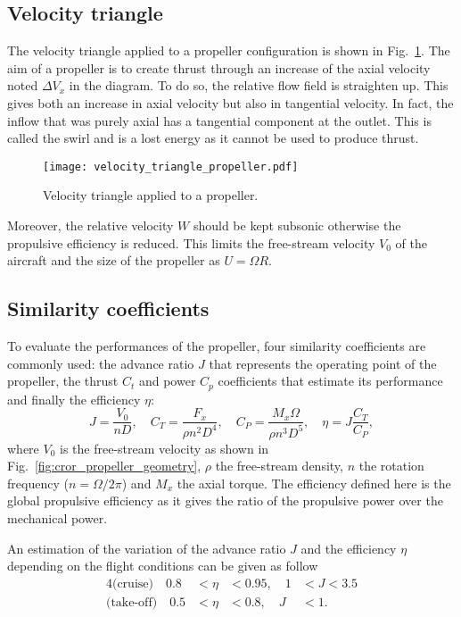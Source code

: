 \subsection{Velocity triangle}
\label{sub:cror_propeller_velocity_triangle}
The velocity triangle applied to a propeller configuration
is shown in Fig.~\ref{fig:cror_velocity_triangle_propeller}.
The aim of a propeller is to create thrust through an increase
of the axial velocity noted $\Delta V_x$ in the diagram. To do
so, the relative flow field is straighten up. This gives both
an increase in axial velocity but also in tangential velocity.
In fact, the inflow that was purely axial has a tangential
component at the outlet. This is called the swirl and
is a lost energy as it cannot be used to produce thrust.
\begin{figure}[htbp]
  \centering
  \texttt{[image: velocity\_triangle\_propeller.pdf]}
  \caption{Velocity triangle applied to a propeller.}
  \label{fig:cror_velocity_triangle_propeller}
\end{figure}
Moreover, the relative velocity $W$ should be kept subsonic
otherwise the propulsive efficiency is reduced. This limits
the free-stream velocity $V_0$ of the aircraft and the size of 
the propeller as $U = \Omega R$.

\subsection{Similarity coefficients}
\label{sub:similarity_coefficients}
To evaluate the performances of the propeller, four similarity
coefficients are commonly used:
the advance ratio $J$ that represents the operating point of the propeller,
the thrust $C_t$ and power $C_p$ coefficients that estimate its performance and finally
the efficiency $\eta$:
\begin{equation}
    J = \frac{V_0}{n D}, \quad
    C_T = \frac{F_x}{\rho n ^ 2  D ^ 4}, \quad
    C_P = \frac{M_x \Omega}{\rho n ^ 3 D ^ 5}, \quad
    \eta = J \frac{C_T}{C_P},
\end{equation}
where $V_0$ is the free-stream velocity 
as shown in Fig.~\ref{fig:cror_propeller_geometry},
$\rho$ the free-stream density,
$n$ the rotation frequency ($n = \Omega / 2 \pi$) and
$M_x$ the axial torque.
The efficiency defined here is the global propulsive efficiency
as it gives the ratio of the propulsive power over the mechanical power.

An estimation of the variation of the advance ratio $J$ and the 
efficiency $\eta$ depending on the flight conditions can be given as follow
\begin{alignat}{4}
    \text{(cruise)} \quad  0.8 &< \eta &< 0.95, \quad 1 &< J < 3.5 \\
    \text{(take-off)} \quad  0.5 &< \eta &< 0.8, \quad J &< 1.
\end{alignat}

